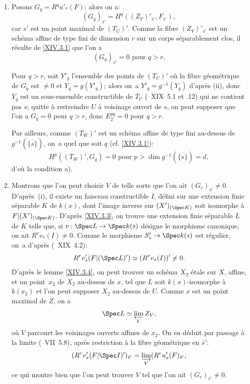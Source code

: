 \begin{enumerate}
\item[$1^\circ)$]
Posons $G_q = R^q u'_*(F)$; alors on a:
$$(G_q)_{\bar{s}'}=H^q((Z_V)'_{\bar{s}'}, F_{\bar{s}'}),
$$
car $s'$ est un point maximal de $(T_U)'$. Comme la fibre $(Z_V)'_{\bar{s}'}$ est un sch\'ema affine de type fini de dimension $r$ sur un corps s\'eparablement clos, il r\'esulte de \ref{XIV.3.1} que l'on a
$$(G_q)_{\bar{s}'}=0 \text{ pour } q>r.
$$

Pour $q>r$, soit $Y'_q$ l'ensemble des points de $(T_U)'$ o\`u la fibre g\'eom\'etrique de $G_q$ est $\neq 0$ et $Y_q=g(Y'_q)$; alors on~a $Y'_q = g^{-1}(Y_q)$ d'apr\`es \textup{(ii)}, donc $Y_q$ est un sous-ensemble constructible de $T_U$ (~XIX~5.1 et .12) qui ne contient pas $s$; quitte \`a restreindre $U$ \`a voisinage ouvert de $s$, on peut supposer que l'on a $G_q=0$ pour $q>r$, donc $E_2^{pq}=0$ pour $q>r$.

Par ailleurs, comme $(T_W)'$ est un sch\'ema affine de type fini au-dessus de $g^{-1}(\overline{\{s\}})$, on~a quel que soit $q$ (cf. \ref{XIV.3.1}):
$$H^p((T_W)', G_q)=0 \text{ pour } p>\dim g^{-1}(\overline{\{s\}})=d,
$$
d'o\`u la condition a).

\item[$2^\circ)$]
Montrons que l'on peut choisir $V$ de telle sorte que l'on ait $(G_r)_{\bar{s}'} \neq 0$. D'apr\`es~\textup{(i)}, il existe un faisceau constructible $I$, d\'efini sur une extension finie s\'eparable $K$ de $k(x)$, dont l'image inverse sur $(X')_{(\Spec K)}$ soit isomorphe \`a $F{|(X')_{(\Spec K)}}$. D'apr\`es \ref{XIV.3.3}, on trouve une extension finie s\'eparable $L$ de $K$ telle que, si $v:\Spec L \to \Spec k(s)$ d\'esigne le morphisme canonique, on ait $R^r v_*(I) \neq 0$. Comme le morphisme $S'_s \to \Spec k(s)$ est r\'egulier, on~a d'apr\`es (~XIX~4.2):
$$R^rv_*'(F{|(\Spec L)'}) \simeq (R^rv_*(I))' \neq 0.
$$
D'apr\`es le lemme \ref{XIV.3.4}, on peut trouver un sch\'ema $X_2$ \'etale sur $X$, affine, et un point~$x_2$ de $X_2$ au-dessus de $x$, tel que $L$ soit $k(x)$-isomorphe \`a $k(x_2)$ et l'on peut supposer $X_2$ au-dessus de $U$. Comme $x$ est un point maximal de $Z$, on a
$$
\Spec L \simeq \varprojlim_V Z_V,
$$
o\`u $V$ parcourt les voisinages ouverts affines de $x_2$. On en d\'eduit par passage \`a la limite (~VII~5.8), apr\`es restriction \`a la fibre g\'eom\'etrique en $\bar{s}'$:
$$
(R^rv_*'(F{|\Spec I})')_{\bar{s}'} = \varinjlim_V (R^ru_*'(F)_{\bar{s}'},
$$
ce qui montre bien que l'on peut trouver $V$ tel que l'on ait $(G_r)_{\bar{s}'} \neq 0$.


\end{enumerate}
